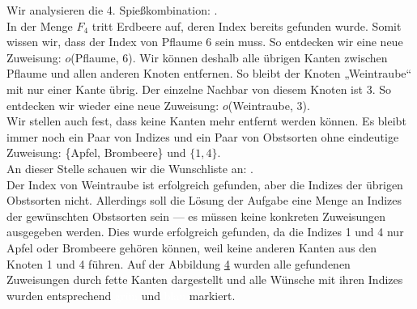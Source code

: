 Wir analysieren die 4. Spießkombination:
.\\
In der Menge $F_4$ tritt Erdbeere auf, deren Index bereits gefunden wurde.
Somit wissen wir, dass der Index von Pflaume 6 sein muss. 
So entdecken wir eine neue Zuweisung: $o$(Pflaume, 6).
Wir können deshalb alle übrigen Kanten zwischen Pflaume und allen anderen Knoten entfernen.
So bleibt der Knoten „Weintraube“ mit nur einer Kante übrig.
Der einzelne Nachbar von diesem Knoten ist 3. So entdecken wir wieder eine neue Zuweisung: $o$(Weintraube, 3).\\
Wir stellen auch fest, dass keine Kanten mehr entfernt werden können.
Es bleibt immer noch ein Paar von Indizes und ein Paar von Obstsorten ohne eindeutige Zuweisung:
\{Apfel, Brombeere\} und $\{1, 4\}$.\\

An dieser Stelle schauen wir die Wunschliste an: .\\
Der Index von Weintraube ist erfolgreich gefunden, aber die Indizes der übrigen Obstsorten nicht.
Allerdings soll die Lösung der Aufgabe eine Menge an Indizes der gewünschten Obstsorten sein ---
es müssen keine konkreten Zuweisungen ausgegeben werden. 
Dies wurde erfolgreich gefunden, da die Indizes 1 und 4 nur Apfel oder Brombeere gehören können, weil
keine anderen Kanten aus den Knoten 1 und 4 führen.
Auf der Abbildung \ref{fig:example0-4} wurden alle gefundenen Zuweisungen durch fette Kanten dargestellt
und alle Wünsche mit ihren Indizes wurden entsprechend \colorbox{black!30!green}{\textcolor{white}{grün}} und \colorbox{black!5!blue}{\textcolor{white}{blau}} markiert.

\begin{figure}[H]
\centering
\begin{adjustbox}{minipage=\linewidth,scale=0.85}
\begin{subfigure}[t]{.24\textwidth}
\centering

\caption{}
\label{fig:example0-1}
\end{subfigure}\hfill
\begin{subfigure}[t]{.24\textwidth}
\centering

\caption{}
\label{fig:example0-2}
\end{subfigure}
\begin{subfigure}[t]{.24\textwidth}
\centering

\caption{}
\label{fig:example0-3}
\end{subfigure}\hfill
\begin{subfigure}[t]{.24\textwidth}
\centering

\caption{}
\label{fig:example0-4}
\end{subfigure}
\end{adjustbox}
\caption{}
\label{fig:example0}
\end{figure}


